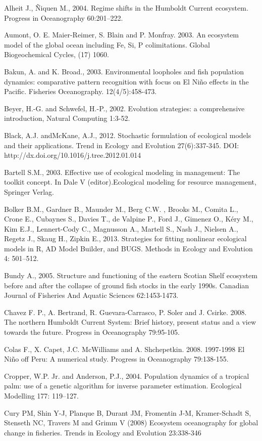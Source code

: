 Alheit J., Ñiquen M., 2004. Regime shifts in the Humboldt Current ecosystem. Progress in Oceanography 60:201–222.

Aumont, O. E. Maier-Reimer, S. Blain and P. Monfray. 2003. An ecosystem model of the global ocean including Fe, Si, P colimitations. Global Biogeochemical Cycles, (17) 1060.

Bakun, A. and K. Broad., 2003. Environmental loopholes and fish population dynamics: comparative pattern recognition with focus on El Niño effects in the Pacific. Fisheries Oceanography. 12(4/5):458-473.

Beyer, H.-G. and Schwefel, H.-P., 2002. Evolution strategies: a comprehensive introduction, Natural Computing 1:3-52.

Black, A.J. andMcKane, A.J., 2012. Stochastic formulation of ecological models and their applications. Trend in Ecology and Evolution 27(6):337-345. DOI: http://dx.doi.org/10.1016/j.tree.2012.01.014

Bartell S.M., 2003. Effective use of ecological modeling in management: The toolkit concept. In Dale V (editor).Ecological modeling for resource management, Springer Verlag.

Bolker B.M., Gardner B., Maunder M., Berg C.W. , Brooks M., Comita L., Crone E., Cubaynes S., Davies T., de Valpine P., Ford J., Gimenez O., Kéry M., Kim E.J., Lennert-Cody C., Magnusson A., Martell S., Nash J., Nielsen A., Regetz J., Skaug H., Zipkin E., 2013. Strategies for fitting nonlinear ecological models in R, AD Model Builder, and BUGS. Methods in Ecology and Evolution 4: 501–512.

Bundy A., 2005.  Structure and functioning of the eastern Scotian Shelf ecosystem before and after the collapse of ground fish stocks in the early 1990s. Canadian Journal of Fisheries And Aquatic Sciences 62:1453-1473.

Chavez F. P., A. Bertrand, R. Guevara-Carrasco, P. Soler and J. Csirke. 2008. The northern Humboldt Current System: Brief history, present status and a view towards the future. Progress in Oceanography 79:95-105.

Colas F., X. Capet, J.C. McWilliams and A. Shchepetkin. 2008. 1997-1998 El Niño off Peru: A numerical study. Progress in Oceanography 79:138-155. 

Cropper, W.P. Jr. and Anderson, P.J., 2004. Population dynamics of a tropical palm: use of a genetic algorithm for inverse parameter estimation. Ecological Modelling 177: 119–127.

Cury PM, Shin Y-J, Planque B, Durant JM, Fromentin J-M, Kramer-Schadt S, Stenseth NC, Travers M and Grimm V (2008) Ecosystem oceanography for global change in fisheries. Trends in Ecology and Evolution 23:338-346

